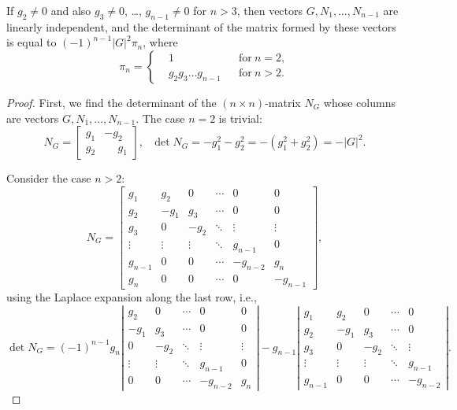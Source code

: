 \documentclass[10pt,a4paper]{amsart}
\begin{document}
\begin{Proposition}\label{prop1}
If $g_2 \neq 0$ and also $g_3 \neq 0$, \dots, $g_{n-1} \neq 0$ for $n > 3$, then vectors $G,N_1,\dots,N_{n-1}$ are linearly independent, and the determinant of the matrix formed by these vectors is equal to $(-1)^{n-1} |G|^2 \pi_n$, where
\begin{equation}\label{eqDefPi}
  \pi_n = \left\{ \begin{aligned}
    & 1 & & \text{for} ~ n = 2, \\
    & g_2 g_3 \dots g_{n-1} & & \text{for} ~ n > 2.
  \end{aligned} \right.
\end{equation}
\end{Proposition}

\begin{proof}
First, we find the determinant of the $(n \times n)$-matrix $N_G$ whose columns are vectors $G,N_1,\dots,N_{n-1}$. The case $n = 2$ is trivial:
\[
  N_G = \left[ \begin{array}{cc}
    g_1 & -g_2 \\
    g_2 & \phantom{-}g_1
  \end{array} \right], \ \ \ \det N_G = -g_1^2 - g_2^2 = -(g_1^2 + g_2^2) = -|G|^2.
\]

Consider the case $n > 2$:
\[
  N_G = \left[
    \begin{array}{cccccc}
      g_1 & g_2 & 0 & \cdots & 0 & 0  \\
      g_2 & -g_1 & g_3 & \cdots & 0 & 0 \\
      g_3 & 0 & -g_2 & \ddots & \vdots & \vdots \\
      \vdots & \vdots & \vdots & \ddots & g_{n-1} & 0 \\
      g_{n-1} & 0 & 0 & \cdots & -g_{n-2} & g_n \\
      g_n & 0 & 0 & \cdots & 0 & -g_{n-1}
    \end{array}
  \right],
\]
using the Laplace expansion along the last row, i.e.,
\[
  \det N_G = (-1)^{n-1} g_n \left|
    \begin{array}{cccccc}
      g_2 & 0 & \cdots & 0 & 0 \\
      -g_1 & g_3 & \cdots & 0 & 0 \\
      0 & -g_2 & \ddots & \vdots & \vdots \\
      \vdots & \vdots & \ddots & g_{n-1} & 0 \\
      0 & 0 & \cdots & -g_{n-2} & g_n
    \end{array}
  \right| - g_{n-1} \left|
    \begin{array}{cccccc}
      g_1 & g_2 & 0 & \cdots & 0 \\
      g_2 & -g_1 & g_3 & \cdots & 0 \\
      g_3 & 0 & -g_2 & \ddots & \vdots \\
      \vdots & \vdots & \vdots & \ddots & g_{n-1} \\
      g_{n-1} & 0 & 0 & \cdots & -g_{n-2}
    \end{array}
  \right|.
\]


\end{proof}
\end{document}
